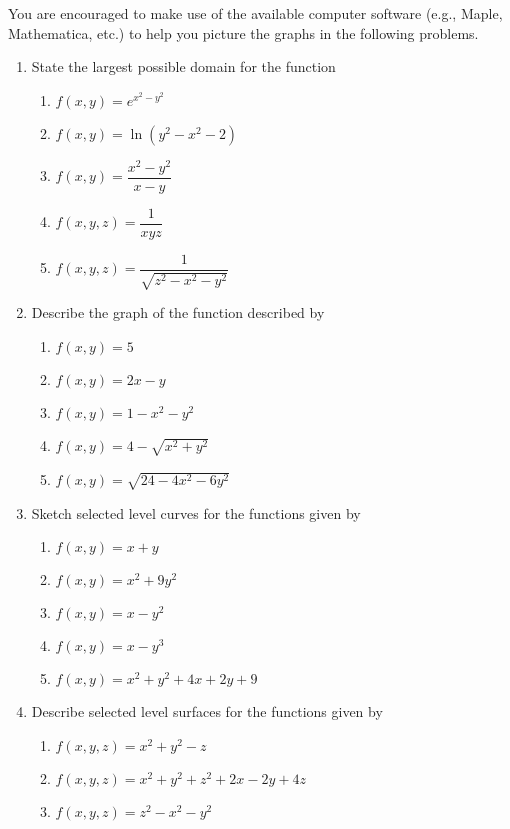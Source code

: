 \begin{exercises}
You are encouraged to make use of the available computer software
(e.g., Maple, Mathematica, etc.) to help you picture the graphs
in the following problems.


\begin{enumerate}
	\item   State the largest possible domain for the function 
	\begin{enumerate}
		\item $f(x,y) =  e^{ x^2-y^2}$ 
		\item $f(x,y) = \ln (y^2-x^2-2)$ 
		\item $f(x,y) = \dfrac {x^2-y^2}{x-y}$ 
		\item $f(x,y,z) = \dfrac {1}{xyz}$ 
		\item $f(x,y,z) = \dfrac {1}{\sqrt {z^2-x^2-y^2}}$ 
	\end{enumerate}

	\item   Describe the graph of the function described by 
	\begin{enumerate}
		\item $f(x,y) = 5$ 
		\item $f(x,y) = 2x - y$ 
		\item $f(x,y) = 1-x^2-y^2$ 
		\item $f(x,y) = 4 - \sqrt {x^2+y^2}$ 
		\item $f(x,y) = \sqrt {24 - 4x^2 - 6y^2}$ 
	\end{enumerate}

	\item   Sketch selected level curves for the functions given by
	\begin{enumerate}
		\item $f(x,y) = x+y$
		\item $f(x,y) = x^2 + 9y^2$
		\item $f(x,y) = x - y^2$
		\item $f(x,y) = x - y^3$
		\item $f(x,y) = x^2 + y^2 + 4x + 2y +9$
	\end{enumerate}

	\item   Describe selected level surfaces for the functions
	given by 
	\begin{enumerate}
		\item $f(x,y,z) = x^2 + y^2 - z$ 
		\item $f(x,y,z) = x^2 + y^2 + z^2 + 2x - 2y + 4z$ 
		\item $f(x,y,z) = z^2 - x^2 - y^2$ 
	\end{enumerate}


\end{enumerate}
\end{exercises}
